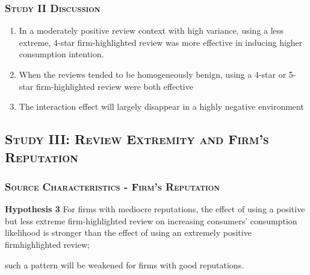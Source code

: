 \documentclass{../presentation}
\begin{document}
    \begin{frame}
        \frametitle{\textsc{Study II Discussion}}

        \begin{enumerate}
            \item In a moderately positive review context with high variance, using a less extreme, 4-star firm-highlighted review was more effective in inducing higher consumption intention.
            \item When the reviews tended to be homogeneously
            benign, using a 4-star or 5-star firm-highlighted review
            were both effective
            \item The interaction effect will largely disappear in a highly negative environment
        \end{enumerate}

    \end{frame}

    \subsection[\textsc{Study III}]{\textsc{Study III: Review Extremity and Firm's Reputation}}

    \begin{frame}
        \frametitle{\textsc{Source Characteristics - Firm's Reputation}}

        \textrm{\bfseries Hypothesis 3} For firms with mediocre reputations, the effect of using a positive but less extreme firm-highlighted review on increasing consumers' consumption likelihood is stronger than the effect of using an extremely positive firmhighlighted review;

        such a pattern will be weakened for firms with good reputations.

    \end{frame}
\end{document}
